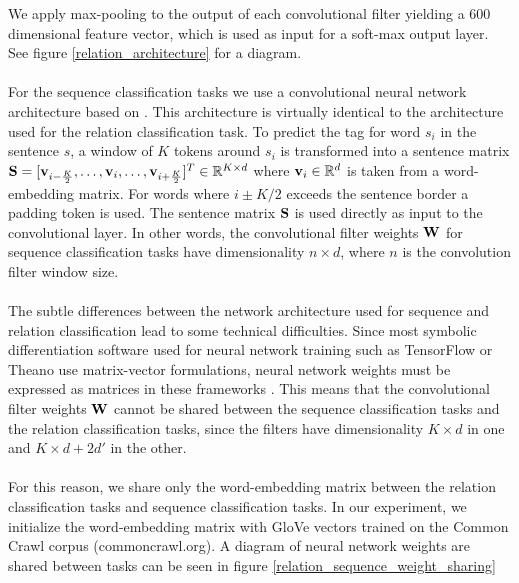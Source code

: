 We apply max-pooling to the output of each convolutional filter yielding a 600 dimensional feature vector, which is used as input for a soft-max output layer. See figure \ref{relation_architecture} for a diagram.
\\\\
For the sequence classification tasks we use a convolutional neural network architecture based on \citet{collobert2011}. This architecture is virtually identical to the architecture used for the relation classification task. To predict the tag for word $s_i$ in the sentence $s$, a window of $K$ tokens around $s_i$ is transformed into a sentence matrix $\mathbf{S} = [\mathbf{v}_{i - \frac{K}{2}},\dots,\mathbf{v}_i,\dots,\mathbf{v}_{i + \frac{K}{2}}]^T \in \mathbb{R}^{K \times d}$ where $\mathbf{v}_i \in \mathbb{R}^d$ is taken from a word-embedding matrix. For words where $i \pm K / 2$ exceeds the sentence border a padding token is used. The sentence matrix $\mathbf{S}$ is used directly as input to the convolutional layer. In other words, the convolutional filter weights $\mathbf{W}$ for sequence classification tasks have dimensionality $n \times d$, where $n$ is the convolution filter window size.
\\\\
The subtle differences between the network architecture used for sequence and relation classification lead to some technical difficulties. Since most symbolic differentiation software used for neural network training such as TensorFlow or Theano use matrix-vector formulations, neural network weights must be expressed as matrices in these frameworks \citep{abadi2016, theano2016}. This means that the convolutional filter weights $\mathbf{W}$ cannot be shared between the sequence classification tasks and the relation classification tasks, since the filters have dimensionality $K \times d$ in one and $K \times d + 2d'$ in the other.
\\\\
For this reason, we share only the word-embedding matrix between the relation classification tasks and sequence classification tasks.
In our experiment, we initialize the word-embedding matrix with GloVe vectors trained on the Common Crawl corpus (commoncrawl.org). A diagram of neural network weights are shared between tasks can be seen in figure \ref{relation_sequence_weight_sharing}

